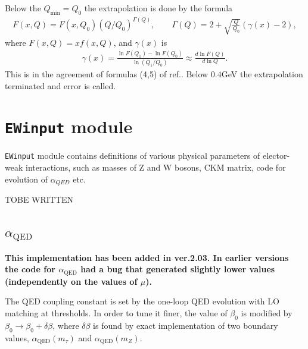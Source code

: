 \documentclass[prd,nofootinbib,eqsecnum,final]{revtex4}
\renewcommand{\(}{\left(}
\renewcommand{\)}{\right)}
\renewcommand{\[}{\left[}
\renewcommand{\]}{\right]}
\newcommand{\red}[1]{{\color[rgb]{1,0,0} #1}}
\begin{document}
Below the $Q_{\text{min}}=Q_0$ the extrapolation is done by the formula
\begin{eqnarray}
F(x,Q)=F(x,Q_0) (Q/Q_0)^{\Gamma(Q)},\qquad \Gamma(Q)=2+\sqrt{\frac{Q}{Q_0}}(\gamma(x)-2),
\end{eqnarray}
where $F(x,Q)=xf(x,Q)$, and $\gamma(x)$ is 
\begin{eqnarray}
\gamma(x)=\frac{\ln F(Q_1)-\ln F(Q_0)}{\ln(Q_1/Q_0)}\approx \frac{d \ln F(Q)}{d\ln Q}.
\end{eqnarray}
This is in the agreement of formulas (4,5) of ref.\cite{Buckley:2014ana}. Below $0.4$GeV the extrapolation terminated and error is called.

\newpage
\section{\texttt{EWinput} module}
\label{EWinput}

\texttt{EWinput} module contains definitions of various physical parameters of elector-weak interactions, such as masses of Z and W bosons, CKM matrix, code for evolution of $\alpha_{QED}$ etc.

\red{TOBE WRITTEN}

\subsection{$\alpha_{\text{QED}}$}

\textbf{This implementation has been added in ver.2.03. In earlier versions the code for $\alpha_{\text{QED}}$ had a bug that generated slightly lower values (independently on the values of $\mu$).}

The QED coupling constant is set by the one-loop QED evolution with LO matching at thresholds. In order to tune it finer, the value of $\beta_0$ is modified by $\beta_0\to \beta_0+\delta \beta$, where $\delta \beta$ is found by exact implementation of two boundary values, $\alpha_{\text{QED}}(m_\tau)$ and $\alpha_{\text{QED}}(m_Z)$. 
\end{document}
